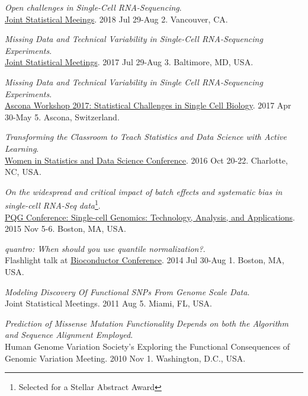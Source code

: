 \documentclass[10pt]{article}
\begin{document}
\item 
{\it Open challenges in Single-Cell RNA-Sequencing}. \\
\href{https://ww2.amstat.org/meetings/jsm/2018/onlineprogram/ActivityDetails.cfm?SessionID=215111}{Joint Statistical Meeings}. 2018 Jul 29-Aug 2. Vancouver, CA.
\item 
{\it Missing Data and Technical Variability in Single-Cell RNA-Sequencing Experiments}. \\
\href{https://ww2.amstat.org/meetings/jsm/2017/}{Joint Statistical Meetings}. 2017 Jul 29-Aug 3. Baltimore, MD, USA.
\item 
{\it Missing Data and Technical Variability in Single Cell RNA-Sequencing Experiments}. \\
\href{https://www.bsse.ethz.ch/cbg/cbg-news/ascona-2017.html}{Ascona Workshop 2017: Statistical Challenges in Single Cell Biology}. 2017 Apr 30-May 5. Ascona, Switzerland.
\item 
{\it Transforming the Classroom to Teach Statistics and Data Science with Active Learning}. \\ 
\href{http://www.amstat.org/meetings/wsds/2016/}{Women in Statistics and Data Science Conference}. 2016 Oct 20-22. Charlotte, NC, USA.
\item
{\it On the widespread and critical impact of batch effects and systematic bias in single-cell RNA-Seq data}\footnote{Selected for a Stellar Abstract Award}. \\ 
 \href{https://www.hsph.harvard.edu/2015-pqg-conference/}{PQG Conference: Single-cell Genomics: Technology, Analysis, and Applications}. 2015 Nov 5-6. Boston, MA, USA.
\item 
{\it quantro: When should you use quantile normalization?}. \\ 
Flashlight talk at \href{https://www.bioconductor.org/help/course-materials/2014/BioC2014/}{Bioconductor Conference}. 2014 Jul 30-Aug 1. Boston, MA, USA.
\item 
{\it Modeling Discovery Of Functional SNPs From Genome Scale Data}. \\
Joint Statistical Meetings. 2011 Aug 5. Miami, FL, USA.
\item 
{\it Prediction of Missense Mutation Functionality Depends on both the Algorithm and Sequence Alignment Employed}. \\
Human Genome Variation Society's Exploring the Functional Consequences of Genomic Variation Meeting. 2010 Nov 1. Washington, D.C., USA.
\end{document}
